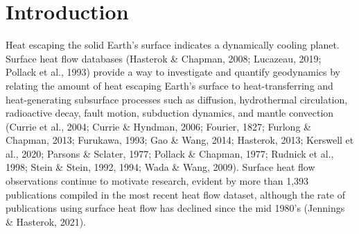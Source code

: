 \documentclass[draft,linenumbers]{agujournal2018}
\begin{document}



\begin{keypoints}
\item 
\item 
\item 
\end{keypoints}

%
%


\begin{abstract}

\end{abstract}
\section{Introduction}

Heat escaping the solid Earth's surface indicates a dynamically cooling
planet. Surface heat flow databases (Hasterok \& Chapman, 2008;
Lucazeau, 2019; Pollack et al., 1993) provide a way to investigate and
quantify geodynamics by relating the amount of heat escaping Earth's
surface to heat-transferring and heat-generating subsurface processes
such as diffusion, hydrothermal circulation, radioactive decay, fault
motion, subduction dynamics, and mantle convection (Currie et al., 2004;
Currie \& Hyndman, 2006; Fourier, 1827; Furlong \& Chapman, 2013;
Furukawa, 1993; Gao \& Wang, 2014; Hasterok, 2013; Kerswell et al.,
2020; Parsons \& Sclater, 1977; Pollack \& Chapman, 1977; Rudnick et
al., 1998; Stein \& Stein, 1992, 1994; Wada \& Wang, 2009). Surface heat
flow observations continue to motivate research, evident by more than
1,393 publications compiled in the most recent heat flow dataset,
although the rate of publications using surface heat flow has declined
since the mid 1980's (Jennings \& Hasterok, 2021).
\end{document}
